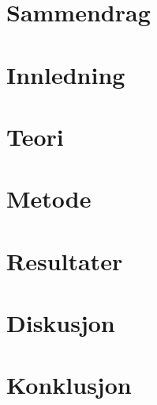 \documentclass[12pt]{article}
\begin{document}
\makedoctitle

\setcounter{page}{1}

\tableofcontents

\clearpage
{}
\section*{Sammendrag}


\clearpage

\setcounter{page}{1}

\section{Innledning}


\section{Teori}


\section{Metode}


\section{Resultater}


\section{Diskusjon}


\section{Konklusjon}


\clearpage

\printbibliography
\end{document}

